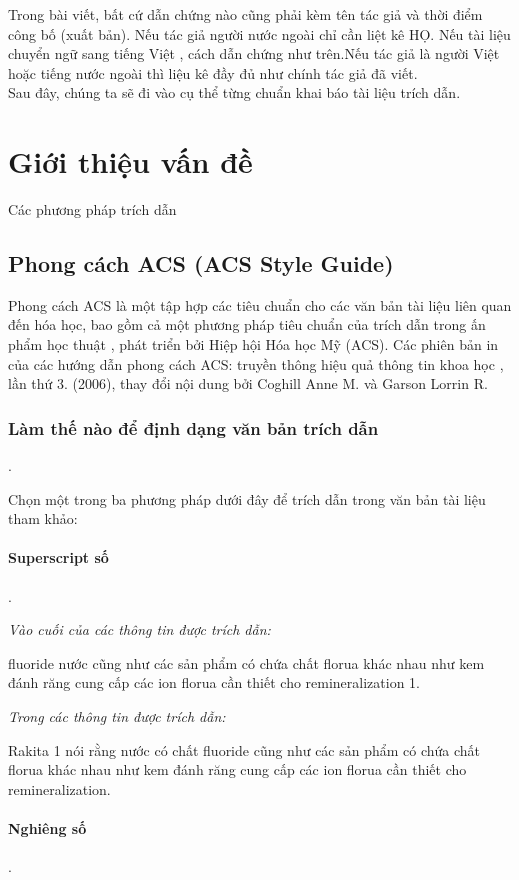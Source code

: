 \documentclass{hcmutarticle}
\begin{document}
Trong bài viết, bất cứ dẫn chứng nào cũng phải kèm tên tác giả và thời điểm công bố (xuất bản). Nếu tác giả người nước ngoài chỉ cần liệt kê HỌ. Nếu tài liệu chuyển ngữ sang tiếng Việt , cách dẫn chứng như trên.Nếu tác giả là người Việt hoặc tiếng nước ngoài thì liệu kê đầy đủ như chính tác giả đã viết.\\
Sau đây, chúng ta sẽ đi vào cụ thể từng chuẩn khai báo tài liệu trích dẫn.
\section{Giới thiệu vấn đề }\label{dev}
Các phương pháp trích dẫn

\subsection{Phong cách ACS (ACS Style Guide)}

Phong cách ACS là một tập hợp các tiêu chuẩn cho các văn bản tài liệu liên quan đến hóa học, bao gồm cả một phương pháp tiêu chuẩn của trích dẫn trong ấn phẩm học thuật , phát triển bởi Hiệp hội Hóa học Mỹ (ACS). Các phiên bản in của các hướng dẫn phong cách ACS: truyền thông hiệu quả thông tin khoa học , lần thứ 3. (2006), thay đổi nội dung bởi Coghill Anne M. và Garson Lorrin R.

\subsubsection{Làm thế nào để định dạng văn bản trích dẫn}.

Chọn một trong ba phương pháp dưới đây để trích dẫn trong văn bản tài liệu tham khảo:

\paragraph{Superscript số}.

{\em Vào cuối của các thông tin được trích dẫn:}

fluoride nước cũng như các sản phẩm có chứa chất florua khác nhau như kem đánh răng cung cấp các ion florua cần thiết cho remineralization 1.

{\em Trong các thông tin được trích dẫn:}

Rakita 1 nói rằng nước có chất fluoride cũng như các sản phẩm có chứa chất florua khác nhau như kem đánh răng cung cấp các ion florua cần thiết cho remineralization.


\paragraph{Nghiêng số}.
\end{document}
